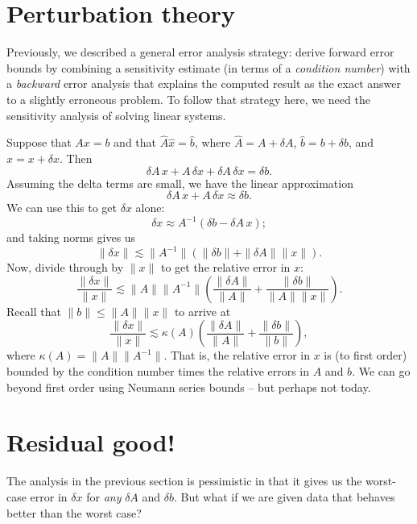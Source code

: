 \documentclass[12pt, leqno]{article}
\begin{document}

\section{Perturbation theory}

Previously, we described a general error analysis strategy: derive
forward error bounds by combining a sensitivity estimate (in terms of
a {\em condition number}) with a {\em backward} error analysis that
explains the computed result as the exact answer to a slightly
erroneous problem.  To follow that strategy here, we need the
sensitivity analysis of solving linear systems.

Suppose that $Ax = b$ and that $\hat{A} \hat{x} = \hat{b}$,
where $\hat{A} = A + \delta A$, $\hat{b} = b + \delta b$,
and $\hat{x} = x + \delta x$.  Then
\[
  \delta A \, x + A \, \delta x + \delta A \, \delta x = \delta b.
\]
Assuming the delta terms are small, we have the linear approximation
\[
  \delta A \, x + A \, \delta x \approx \delta b.
\]
We can use this to get $\delta x$ alone:
\[
  \delta x \approx A^{-1} (\delta b - \delta A \, x);
\]
and taking norms gives us
\[
  \|\delta x\| \lesssim \|A^{-1}\| (\|\delta b\| + \|\delta A\| \|x\|).
\]
Now, divide through by $\|x\|$ to get the relative error in $x$:
\[
  \frac{\|\delta x\|}{\|x\|} \lesssim \|A\| \|A^{-1}\|
    \left( \frac{\|\delta A\|}{\|A\|} + \frac{\|\delta b\|}{\|A\|\|x\|} \right).
\]
Recall that $\|b\| \leq \|A\|\|x\|$ to arrive at
\[
  \frac{\|\delta x\|}{\|x\|} \lesssim \kappa(A)
    \left( \frac{\|\delta A\|}{\|A\|} + \frac{\|\delta b\|}{\|b\|} \right),
\]
where $\kappa(A) = \|A\| \|A^{-1}\|$.  That is, the relative error in
$x$ is (to first order) bounded by the condition number times the relative
errors in $A$ and $b$.  We can go beyond first order using Neumann
series bounds -- but perhaps not today.

\section{Residual good!}

The analysis in the previous section is pessimistic in that it gives us
the worst-case error in $\delta x$ for {\em any} $\delta A$ and $\delta b$.
But what if we are given data that behaves better than the worst case?
\end{document}
